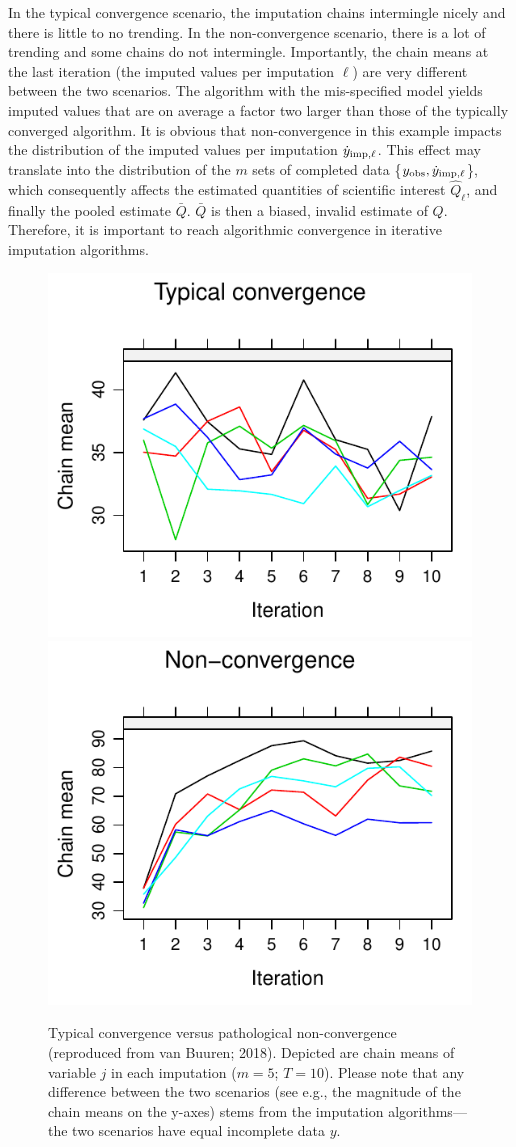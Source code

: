 \documentclass[Royal,times,sageh]{sagej}
\begin{document}
In the typical convergence scenario, the imputation chains intermingle nicely and there is little to no trending. In the non-convergence scenario, there is a lot of trending and some chains do not intermingle. Importantly, the chain means at the last iteration (the imputed values per imputation \(\ell\)) are very different between the two scenarios. The algorithm with the mis-specified model yields imputed values that are on average a factor two larger than those of the typically converged algorithm. It is obvious that non-convergence in this example impacts the distribution of the imputed values per imputation \(\dot y_{\rm imp, \ell}\). This effect may translate into the distribution of the \(m\) sets of completed data \{\(y_{\rm obs}, \dot y_{\rm imp, \ell}\)\}, which consequently affects the estimated quantities of scientific interest \(\hat{Q}_{\ell}\), and finally the pooled estimate \(\bar{Q}\). \(\bar{Q}\) is then a biased, invalid estimate of \(Q\). Therefore, it is important to reach algorithmic convergence in iterative imputation algorithms.

\begin{figure}

{\centering \includegraphics[width=.49\linewidth]{2.Manuscript_files/figure-latex/non-conv-1} \includegraphics[width=.49\linewidth]{2.Manuscript_files/figure-latex/non-conv-2} 

}

\caption{Typical convergence versus pathological non-convergence (reproduced from van Buuren; 2018). Depicted are chain means of variable $j$ in each imputation ($m=5$; $T=10$). Please note that any difference between the two scenarios (see e.g., the magnitude of the chain means on the y-axes) stems from the imputation algorithms---the two scenarios have equal incomplete data $y$.}\label{fig:non-conv}
\end{figure}
\end{document}

